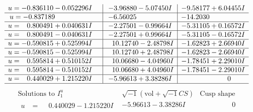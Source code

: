 \documentclass[1p]{elsarticle_modified}
\theoremstyle{definition}
\newcommand{\I}{\sqrt{-1}}
\begin{document}
$$\begin{array}{c|c|c}
\begin{aligned}
u &= -0.836110 - 0.052296 I\end{aligned}
 & -3.96880 - 5.07450 I & -9.58177 + 6.04455 I \\ \hline\begin{aligned}
u &= -0.837189\phantom{ +0.000000I}\end{aligned}
 & -6.56025\phantom{ +0.000000I} & -14.2030\phantom{ +0.000000I} \\ \hline\begin{aligned}
u &= \phantom{-}0.800491 + 0.040631 I\end{aligned}
 & -2.27501 - 0.99664 I & -5.31105 + 0.16572 I \\ \hline\begin{aligned}
u &= \phantom{-}0.800491 - 0.040631 I\end{aligned}
 & -2.27501 + 0.99664 I & -5.31105 - 0.16572 I \\ \hline\begin{aligned}
u &= -0.590815 + 0.525994 I\end{aligned}
 & \phantom{-}10.12740 - 2.48798 I & -1.62823 + 2.66940 I \\ \hline\begin{aligned}
u &= -0.590815 - 0.525994 I\end{aligned}
 & \phantom{-}10.12740 + 2.48798 I & -1.62823 - 2.66940 I \\ \hline\begin{aligned}
u &= \phantom{-}0.595814 + 0.510152 I\end{aligned}
 & \phantom{-}10.06680 - 4.04960 I & -1.78451 + 2.29010 I \\ \hline\begin{aligned}
u &= \phantom{-}0.595814 - 0.510152 I\end{aligned}
 & \phantom{-}10.06680 + 4.04960 I & -1.78451 - 2.29010 I \\ \hline\begin{aligned}
u &= \phantom{-}0.440029 + 1.215220 I\end{aligned}
 & -5.96613 + 3.38286 I & \phantom{-0.000000 } 0\\
 \hline 
 \end{array}$$\newpage$$\begin{array}{c|c|c}  
\text{Solutions to }I^u_{1}& \I (\text{vol} + \sqrt{-1}CS) & \text{Cusp shape}\\
 \hline 
\begin{aligned}
u &= \phantom{-}0.440029 - 1.215220 I\end{aligned}
 & -5.96613 - 3.38286 I & \phantom{-0.000000 } 0 \\ \hline\begin{aligned}

\end{aligned}
\end{array}$$
\end{document}
